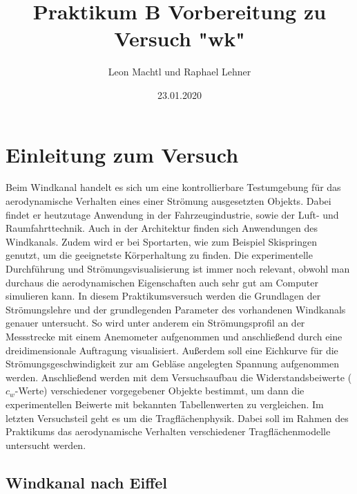 \documentclass[a4paper,10pt]{scrartcl}
\title{Praktikum B Vorbereitung zu Versuch "wk"}
\author{Leon Machtl und Raphael Lehner}
\date{23.01.2020}
\begin{document}
	\maketitle
	\tableofcontents
	\newpage
	
	\section{Einleitung zum Versuch}
		Beim Windkanal handelt es sich um eine kontrollierbare Testumgebung für das aerodynamische Verhalten eines einer Strömung ausgesetzten Objekts. Dabei findet er heutzutage Anwendung in der Fahrzeugindustrie, sowie der Luft- und Raumfahrttechnik. Auch in der Architektur finden sich Anwendungen des Windkanals. Zudem wird er bei Sportarten, wie zum Beispiel Skispringen genutzt, um die geeignetste Körperhaltung zu finden. Die experimentelle Durchführung und Strömungsvisualisierung ist immer noch relevant, obwohl man durchaus die aerodynamischen Eigenschaften auch sehr gut am Computer simulieren kann.
		In diesem Praktikumsversuch werden die Grundlagen der Strömungslehre und der grundlegenden Parameter des vorhandenen Windkanals genauer untersucht. So wird unter anderem ein Strömungsprofil an der
		Messstrecke mit einem Anemometer aufgenommen und anschließend durch eine dreidimensionale Auftragung visualisiert. Außerdem soll eine Eichkurve für die Strömungsgeschwindigkeit zur am Gebläse angelegten Spannung aufgenommen werden. Anschließend werden mit dem Versuchsaufbau die Widerstandsbeiwerte (\(c_{w}\)-Werte) verschiedener vorgegebener Objekte bestimmt, um dann die experimentellen Beiwerte mit bekannten Tabellenwerten zu vergleichen. Im letzten Versuchsteil geht es um die Tragflächenphysik. Dabei soll im Rahmen des Praktikums das aerodynamische Verhalten verschiedener Tragflächenmodelle untersucht werden.
		
		\subsection{Windkanal nach Eiffel}
		
\end{document}
